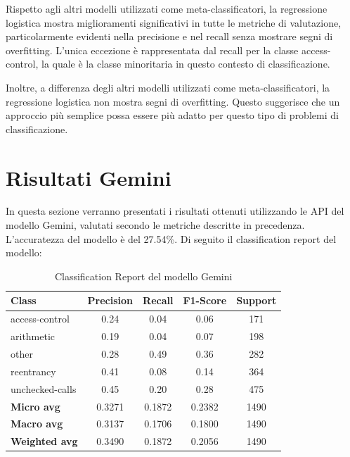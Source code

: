 \documentclass[../../Thesis.tex]{subfiles}
\begin{document}
Rispetto agli altri modelli utilizzati come meta-classificatori, la regressione logistica mostra miglioramenti significativi in tutte le metriche di valutazione, particolarmente evidenti nella precisione e nel recall senza mostrare segni di overfitting. L'unica eccezione \`e rappresentata dal recall per la classe access-control, la quale \`e la classe minoritaria in questo contesto di classificazione.

Inoltre, a differenza degli altri modelli utilizzati come meta-classificatori, la regressione logistica non mostra segni di overfitting. Questo suggerisce che un approccio pi\`u semplice possa essere pi\`u adatto per questo tipo di problemi di classificazione.



\section{Risultati Gemini}

In questa sezione verranno presentati i risultati ottenuti utilizzando le API del modello Gemini, valutati secondo le metriche descritte in precedenza.\\
L'accuratezza del modello \`e del 27.54\%. Di seguito il classification report del modello:


\begin{table}[H]
    \centering
    \small
    \begin{tabular}{lcccc}
    \hline
    \textbf{Class} & \textbf{Precision} & \textbf{Recall} & \textbf{F1-Score} & \textbf{Support} \\
    \hline
    access-control & 0.24 & 0.04 & 0.06 & 171 \\
    arithmetic & 0.19 & 0.04 & 0.07 & 198 \\
    other & 0.28 & 0.49 & 0.36 & 282 \\
    reentrancy & 0.41 & 0.08 & 0.14 & 364 \\
    unchecked-calls & 0.45 & 0.20 & 0.28 & 475 \\
    \hline
    \textbf{Micro avg} & 0.3271 & 0.1872 & 0.2382 & 1490 \\
    \textbf{Macro avg} & 0.3137 & 0.1706 & 0.1800 & 1490 \\
    \textbf{Weighted avg} & 0.3490 & 0.1872 & 0.2056 & 1490 \\
    \hline
\end{tabular}
\caption{Classification Report del modello Gemini}
\end{table}
\end{document}
